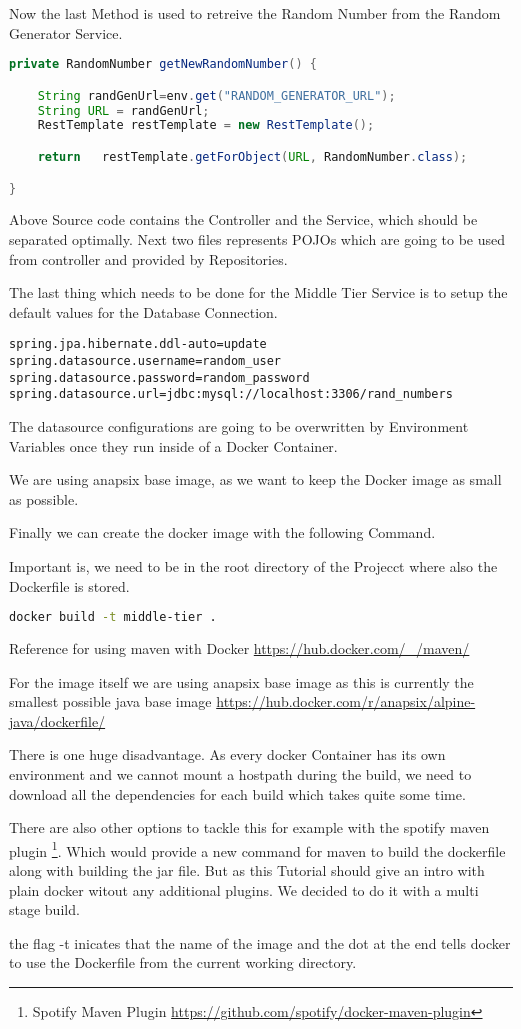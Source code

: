 Now the last Method is used to retreive the Random Number from the Random Generator Service.
\begin{lstlisting}[language=Java]
private RandomNumber getNewRandomNumber() {

    String randGenUrl=env.get("RANDOM_GENERATOR_URL");
    String URL = randGenUrl;
    RestTemplate restTemplate = new RestTemplate();

    return   restTemplate.getForObject(URL, RandomNumber.class);

}
\end{lstlisting}
Above Source code contains the Controller and the Service, which should be separated optimally.
Next two files represents POJOs which are going to be used from controller and provided by Repositories.

The last thing which needs to be done for the Middle Tier Service is to setup the default values for the Database Connection.
\begin{lstlisting}
spring.jpa.hibernate.ddl-auto=update
spring.datasource.username=random_user
spring.datasource.password=random_password
spring.datasource.url=jdbc:mysql://localhost:3306/rand_numbers
\end{lstlisting}
The datasource configurations are going to be overwritten by Environment Variables once they run inside of a Docker Container.



We are using anapsix base image, as we want to keep the Docker image as small as possible.

Finally we can create the docker image with the following Command.

Important is, we need to be in the root directory of the Projecct where also the Dockerfile is stored.
\begin{lstlisting}[language=Bash]
docker build -t middle-tier .
\end{lstlisting}

Reference for using maven with Docker \url{https://hub.docker.com/_/maven/}

For the image itself we are using anapsix base image as this is currently the smallest possible java base image \url{https://hub.docker.com/r/anapsix/alpine-java/dockerfile/}


There is one huge disadvantage. As every docker Container has its own environment and we cannot mount a hostpath during the build, we need to download all the dependencies for each build which takes quite some time.

There are also other options to tackle this for example with the spotify maven plugin \footnote{Spotify Maven Plugin \url{https://github.com/spotify/docker-maven-plugin}}. Which would provide a new command for maven to build the dockerfile along with building the jar file. But as this Tutorial should give an intro with plain docker witout any additional plugins. We decided to do it with a multi stage build.

the flag -t inicates that the name of the image and the dot at the end tells docker to use the Dockerfile from the current working directory.